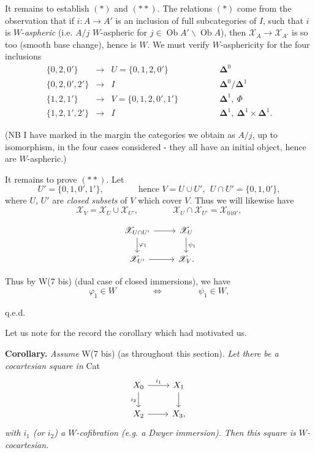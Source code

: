 \documentclass[11pt]{article}
\newcommand{\printedpage}[1]{\marginpar{\footnotesize p.~#1}}
\newcommand{\msp}[1]{\marginpar{\footnotesize [#1]}}
\newcommand{\cX}{\mathscr{X}}
\newcommand{\Ob}{\operatorname{Ob}}
\begin{document}
It remains to establish $(\ast)$ and $(\ast\ast)$. The relations $(\ast)$ come from the observation that if $i : A \longrightarrow A'$ is an inclusion of full subcategories of $I$, such that $i$ is $W$-\textit{aspheric} (i.e. $A/j$ $W$-aspheric for $j \in \Ob A'\backslash\Ob A$), then $\cX_A \longrightarrow \cX_{A'}$ is so too (smooth base change), hence is $W$. We must verify $W$-asphericity for the four inclusions
\[
\begin{array}{rcll}
\{0,2,0'\} & \longrightarrow & U = \{0,1,2,0'\} & \qquad\qquad \mathbf{\Delta}^0 \\[1ex]
\{0,2,0',2'\} & \longrightarrow & I & \qquad\qquad \mathbf{\Delta}^0/\mathbf{\Delta}^1 \\[1ex]
\{1,2,1'\} & \longrightarrow & V = \{0,1,2,0',1'\} & \qquad\qquad \mathbf{\Delta}^1,\ \Phi \\[1ex]
\{1,2,1',2'\} & \longrightarrow & I & \qquad\qquad \mathbf{\Delta}^1,\ \mathbf{\Delta}^1 \times \mathbf{\Delta}^1.
\end{array}
\]

\printedpage{154}

(NB I have marked in the margin the categories we obtain as $A/j$, up to isomorphism, in the four cases considered - they all have an initial object, hence are $W$-aspheric.)

It remains to prove $(\ast\ast)$. Let
\[
U' = \{0,1,0',1'\}, \qquad\qquad \text{hence } V = U \cup U',\ \ U \cap U' = \{0,1,0'\},
\]
where $U$, $U'$ are \textit{closed subsets} of $V$ which cover $V$. Thus we will likewise have
\[
\cX_V = \cX_U \cup \cX_{U'}, \qquad\qquad \cX_U \cap \cX_{U'} = \cX_{010'},
\]

\msp{page 239}

\[
\begin{tikzcd}[ampersand replacement=\&]
\cX_{U\cap U'} \arrow[r] \arrow[d, "\varphi_1"] \& \cX_U \arrow[d, "\psi_1"] \\
\cX_{U'} \arrow[r] \& \cX_V.
\end{tikzcd}
\]

Thus by W(7 bis) (dual case of closed immersions), we have
\[
\varphi_1 \in W \qquad\qquad \Longleftrightarrow \qquad\qquad \psi_1 \in W,
\]

\hfill q.e.d.

Let us note for the record the corollary which had motivated us.

\textbf{Corollary.} \textit{Assume} W(7 bis) (as throughout this section). \textit{Let there be a cocartesian square in} Cat
\[
\begin{tikzcd}[ampersand replacement=\&]
X_0 \arrow[r, "i_1"] \arrow[d, "i_2"'] \& X_1 \arrow[d] \\
X_2 \arrow[r] \& X_3,
\end{tikzcd}
\]
\textit{with $i_1$ (or $i_2$) a $W$-cofibration (e.g. a Dwyer immersion). Then this square is $W$-cocartesian.}
\end{document}
